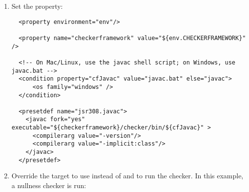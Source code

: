 \begin{enumerate}
\item
Set the  property:

\begin{smaller}
\begin{Verbatim}
  <property environment="env"/>

  <property name="checkerframework" value="${env.CHECKERFRAMEWORK}" />

  <!-- On Mac/Linux, use the javac shell script; on Windows, use javac.bat -->
  <condition property="cfJavac" value="javac.bat" else="javac">
      <os family="windows" />
  </condition>

  <presetdef name="jsr308.javac">
    <javac fork="yes" executable="${checkerframework}/checker/bin/${cfJavac}" >
      <compilerarg value="-version"/>
      <compilerarg value="-implicit:class"/>
    </javac>
  </presetdef>
\end{Verbatim}
\end{smaller}

\item
Override the  target to
use  instead of  and to run the checker.
In this example, a nullness checker is run:


\end{enumerate}

